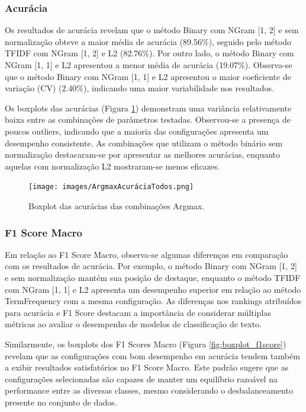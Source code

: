 \subsubsection{Acurácia}

Os resultados de acurácia revelam que o método Binary com NGram [1, 2] e sem normalização obteve a maior média de acurácia (89.56\%), seguido pelo método TFIDF com NGram [1, 2] e L2 (82.76\%). Por outro lado, o método Binary com NGram [1, 1] e L2 apresentou a menor média de acurácia (19.07\%). Observa-se que o método Binary com NGram [1, 1] e L2 apresentou o maior coeficiente de variação (CV) (2.40\%), indicando uma maior variabilidade nos resultados.

Os boxplots das acurácias (Figura \ref{fig:boxplot_acuracia}) demonstram uma variância relativamente baixa entre as combinações de parâmetros testadas. Observou-se a presença de poucos outliers, indicando que a maioria das configurações apresenta um desempenho consistente. As combinações que utilizam o método binário sem normalização destacaram-se por apresentar as melhores acurácias, enquanto aquelas com normalização L2 mostraram-se menos eficazes.
\begin{figure}[H]
    \centering
    \texttt{[image: images/ArgmaxAcuráciaTodos.png]}
    \caption{Boxplot das acurácias das combinações Argmax.}
    \label{fig:boxplot_acuracia}
\end{figure}

\subsubsection{F1 Score Macro}


Em relação ao F1 Score Macro, observa-se algumas diferenças em comparação com os resultados de acurácia. Por exemplo, o método Binary com NGram [1, 2] e sem normalização mantém sua posição de destaque, enquanto o método TFIDF com NGram [1, 1] e L2 apresenta um desempenho superior em relação ao método TermFrequency com a mesma configuração. As diferenças nos rankings atribuídos para acurácia e F1 Score destacam a importância de considerar múltiplas métricas ao avaliar o desempenho de modelos de classificação de texto.

Similarmente, os boxplots dos F1 Scores Macro (Figura \ref{fig:boxplot_f1score}) revelam que as configurações com bom desempenho em acurácia tendem também a exibir resultados satisfatórios no F1 Score Macro. Este padrão sugere que as configurações selecionadas são capazes de manter um equilíbrio razoável na performance entre as diversas classes, mesmo considerando o desbalanceamento presente no conjunto de dados.

